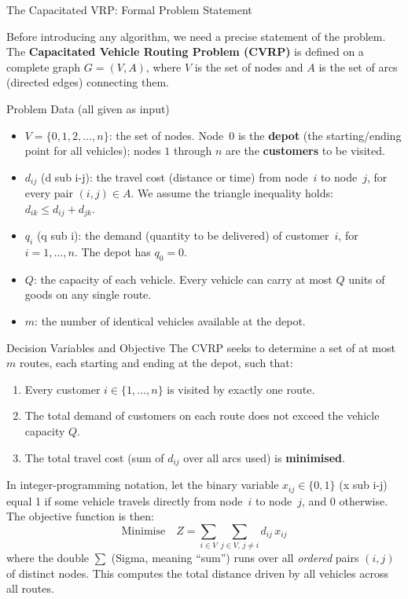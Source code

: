 \documentclass[aspectratio=169,10pt]{beamer}
\begin{document}
\begin{frame}[allowframebreaks]{The Capacitated VRP: Formal Problem Statement}

  Before introducing any algorithm, we need a precise statement of the
  problem.  The \textbf{Capacitated Vehicle Routing Problem (CVRP)} is
  defined on a complete graph $G = (V, A)$, where $V$ is the set of nodes
  and $A$ is the set of arcs (directed edges) connecting them.

  \begin{block}{Problem Data (all given as input)}
    \begin{itemize}
      \item $V = \{0, 1, 2, \ldots, n\}$: the set of nodes.  Node~0 is the
            \textbf{depot} (the starting/ending point for all vehicles);
            nodes $1$ through $n$ are the \textbf{customers} to be visited.
      \item $d_{ij}$ (d sub i-j): the travel cost (distance or time) from
            node~$i$ to node~$j$, for every pair $(i,j) \in A$.  We assume
            the triangle inequality holds: $d_{ik} \le d_{ij} + d_{jk}$.
      \item $q_i$ (q sub i): the demand (quantity to be delivered) of
            customer~$i$, for $i = 1, \ldots, n$.  The depot has $q_0 = 0$.
      \item $Q$: the capacity of each vehicle.  Every vehicle can carry at
            most $Q$ units of goods on any single route.
      \item $m$: the number of identical vehicles available at the depot.
    \end{itemize}
  \end{block}

  \framebreak

  \begin{block}{Decision Variables and Objective}
    The CVRP seeks to determine a set of at most $m$ routes, each
    starting and ending at the depot, such that:
    \begin{enumerate}
      \item Every customer $i \in \{1, \ldots, n\}$ is visited by exactly
            one route.
      \item The total demand of customers on each route does not exceed
            the vehicle capacity $Q$.
      \item The total travel cost (sum of $d_{ij}$ over all arcs used)
            is \textbf{minimised}.
    \end{enumerate}
    In integer-programming notation, let the binary variable
    $x_{ij} \in \{0,1\}$ (x sub i-j) equal 1 if some vehicle travels
    directly from node~$i$ to node~$j$, and 0 otherwise.  The objective
    function is then:
    \[
      \text{Minimise} \quad Z = \sum_{i \in V} \sum_{j \in V,\, j \ne i} d_{ij}\, x_{ij}
    \]
    where the double $\sum$ (Sigma, meaning ``sum'') runs over all
    \emph{ordered} pairs $(i,j)$ of distinct nodes.  This computes the
    total distance driven by all vehicles across all routes.
  \end{block}


\end{frame}
\end{document}
